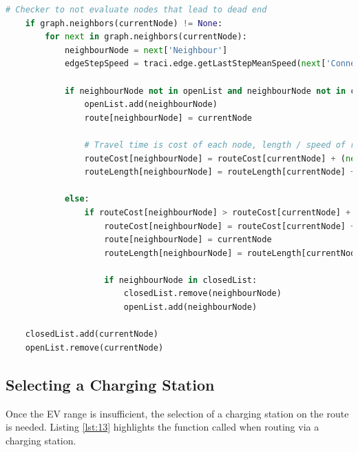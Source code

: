 \documentclass[11pt]{report}
\begin{document}
\begin{lstlisting}[language=Python, caption=A* neighbouring nodes evaluation, label={lst:12}]
    # Checker to not evaluate nodes that lead to dead end
    if graph.neighbors(currentNode) != None:
        for next in graph.neighbors(currentNode):
            neighbourNode = next['Neighbour']
            edgeStepSpeed = traci.edge.getLastStepMeanSpeed(next['ConnectingEdge'])

            if neighbourNode not in openList and neighbourNode not in closedList:
                openList.add(neighbourNode)
                route[neighbourNode] = currentNode

                # Travel time is cost of each node, length / speed of road, this gets fastest and shortest route
                routeCost[neighbourNode] = routeCost[currentNode] + (next['Length'] / edgeStepSpeed)
                routeLength[neighbourNode] = routeLength[currentNode] + next['Length']

            else:
                if routeCost[neighbourNode] > routeCost[currentNode] + (next['Length'] / edgeStepSpeed):
                    routeCost[neighbourNode] = routeCost[currentNode] + (next['Length'] / edgeStepSpeed)
                    route[neighbourNode] = currentNode
                    routeLength[neighbourNode] = routeLength[currentNode] + next['Length']

                    if neighbourNode in closedList:
                        closedList.remove(neighbourNode)
                        openList.add(neighbourNode)

    closedList.add(currentNode)
    openList.remove(currentNode)
\end{lstlisting}

\subsection{Selecting a Charging Station}

Once the EV range is insufficient, the selection of a charging station on the route is needed. Listing \ref{lst:13} highlights the function called when routing via a charging station.
\end{document}
